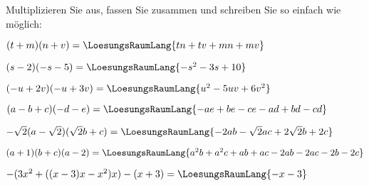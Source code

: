 Multiplizieren Sie aus, fassen Sie zusammen und schreiben Sie so
einfach wie möglich:
\begin{bbwAufgabenBlock}
\item $(t+m)(n+v)=\LoesungsRaumLang{tn+tv+mn+mv}$
\item $(s-2)(-s-5) =\LoesungsRaumLang{-s^2-3s+10}$
\item $(-u+2v)(-u+3v) = \LoesungsRaumLang{u^2-5uv +6v^2}$
\item $(a-b+c)(-d-e)=\LoesungsRaumLang{-ae+be-ce-ad+bd-cd}$
\item $-\sqrt{2}(a-\sqrt{2})(\sqrt{2}b + c)
=\LoesungsRaumLang{-2ab- \sqrt{2}ac + 2\sqrt{2}b +2c}$
\item $(a+1)(b+c)(a-2) = \LoesungsRaumLang{a^2b+a^2c+ab+ac-2ab-2ac-2b-2c}$
\item $-(3x^2+((x-3)x-x^2)x)-(x+3) = \LoesungsRaumLang{-x-3}$
\end{bbwAufgabenBlock} 
\newpage
